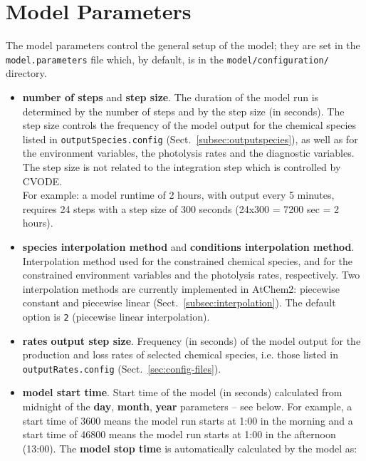 \section{Model Parameters} \label{sec:model-parameters}

The model parameters control the general setup of the model; they are
set in the \texttt{model.parameters} file which, by default, is
in the \texttt{model/configuration/} directory.

\begin{itemize}
\item \textbf{number of steps} and \textbf{step size}. The duration of
  the model run is determined by the number of steps and by the step
  size (in seconds). The step size controls the frequency of the model
  output for the chemical species listed in \texttt{outputSpecies.config}
  (Sect.~\ref{subsec:outputspecies}), as well as for the environment
  variables, the photolysis rates and the diagnostic variables. The
  step size is not related to the integration step which is controlled
  by CVODE.\\
  For example: a model runtime of 2 hours, with output every 5
  minutes, requires 24 steps with a step size of 300 seconds (24x300 =
  7200 sec = 2 hours).
\item \textbf{species interpolation method} and
  \textbf{conditions interpolation method}. Interpolation method used
  for the constrained chemical species, and for the constrained
  environment variables and the photolysis rates, respectively. Two
  interpolation methods are currently implemented in AtChem2:
  piecewise constant and piecewise linear
  (Sect.~\ref{subsec:interpolation}). The default option is \texttt{2}
  (piecewise linear interpolation).
\item \textbf{rates output step size}. Frequency (in seconds) of the
  model output for the production and loss rates of selected chemical
  species, i.e. those listed in \texttt{outputRates.config}
  (Sect.~\ref{sec:config-files}).
\item \textbf{model start time}. Start time of the model (in seconds)
  calculated from midnight of the \textbf{day}, \textbf{month},
  \textbf{year} parameters -- see below. For example, a start time of
  3600 means the model run starts at 1:00 in the morning and a start
  time of 46800 means the model run starts at 1:00 in the afternoon
  (13:00). The \textbf{model stop time} is automatically calculated by
  the model as:
  \begin{verbatim}

\end{verbatim}
\end{itemize}
